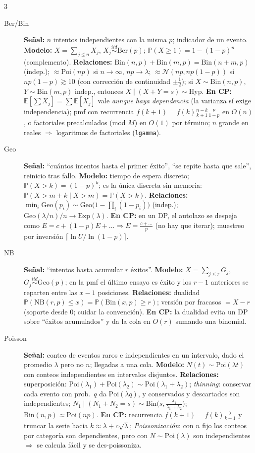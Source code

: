 \documentclass[8pt, spanish, mexico, letterpaper]{extarticle}
\newcommand{\E}{\mathbb{E}}
\newcommand{\Prob}{\mathbb{P}}
\newcommand{\<}{<}
\begin{document}
\begin{multicols*}{3}
\begin{description}
\item[Ber/Bin] \textbf{Señal:} $n$ intentos independientes con la misma $p$; indicador de un evento. \textbf{Modelo:} $X=\sum_{j\le n}X_j$, $X_j\overset{iid}\sim\mathrm{Ber}(p)$; $\Prob(X\ge1)=1-(1-p)^n$ (complemento). \textbf{Relaciones:} $\mathrm{Bin}(n,p)+\mathrm{Bin}(m,p)=\mathrm{Bin}(n + m,p)$ (indep.); $\approx\mathrm{Poi}(np)$ si $n\to\infty$, $np\to\lambda$; $\approx\mathcal N(np,np(1 - p))$ si $np(1 - p)\gtrsim10$ (con corrección de continuidad $\pm\frac12$); si $X\sim\mathrm{Bin}(n,p)$, $Y\sim\mathrm{Bin}(m,p)$ indep., entonces $X\mid(X + Y{=}s)\sim\mathrm{Hyp}$. \textbf{En CP:} $\E[\sum X_j]=\sum\E[X_j]$ vale \emph{aunque haya dependencia} (la varianza sí exige independencia); pmf con recurrencia $f(k + 1)=f(k)\frac{n-k}{k+1}\frac p{1-p}$ en $O(n)$, o factoriales precalculados (mod $M$) en $O(1)$ por término; $n$ grande en reales $\Rightarrow$ logaritmos de factoriales (\texttt{lgamma}).

\item[Geo] \textbf{Señal:} ``cuántos intentos hasta el primer éxito'', ``se repite hasta que sale'', reinicio tras fallo. \textbf{Modelo:} tiempo de espera discreto; $\Prob(X > k)=(1 - p)^k$; es la única discreta sin memoria: $\Prob(X > m + k\mid X>m)=\Prob(X > k)$. \textbf{Relaciones:} $\min_i\mathrm{Geo}(p_i)\sim\mathrm{Geo}\bigl(1-\prod_i(1 - p_i)\bigr)$ (indep.); $\mathrm{Geo}(\lambda/n)/n\to\mathrm{Exp}(\lambda)$. \textbf{En CP:} en un DP, el autolazo se despeja como $E=c+(1 - p)E+\dots\Rightarrow E=\frac{c+\dots}{p}$ (no hay que iterar); muestreo por inversión $\lceil\ln U/\ln(1 - p)\rceil$.

\item[NB] \textbf{Señal:} ``intentos hasta acumular $r$ éxitos''. \textbf{Modelo:} $X=\sum_{j\le r}G_j$, $G_j\overset{iid}\sim\mathrm{Geo}(p)$; en la pmf el último ensayo es éxito y los $r - 1$ anteriores se reparten entre las $x - 1$ posiciones. \textbf{Relaciones:} dualidad $\Prob(\mathrm{NB}(r,p)\le x)=\Prob(\mathrm{Bin}(x,p)\ge r)$; versión por fracasos $=X-r$ (soporte desde 0; cuidar la convención). \textbf{En CP:} la dualidad evita un DP sobre ``éxitos acumulados'' y da la cola en $O(r)$ sumando una binomial.

\item[Poisson] \textbf{Señal:} conteo de eventos raros e independientes en un intervalo, dado el promedio $\lambda$ pero no $n$; llegadas a una cola. \textbf{Modelo:} $N(t)\sim\mathrm{Poi}(\lambda t)$ con conteos independientes en intervalos disjuntos. \textbf{Relaciones:} superposición: $\mathrm{Poi}(\lambda_1) + \mathrm{Poi}(\lambda_2)\sim\mathrm{Poi}(\lambda_1 + \lambda_2)$; \emph{thinning}: conservar cada evento con prob.\ $q$ da $\mathrm{Poi}(\lambda q)$, y conservados y descartados son independientes; $N_1\mid(N_1 + N_2{=}s)\sim\mathrm{Bin}\bigl(s,\frac{\lambda_1}{\lambda_1+\lambda_2}\bigr)$; $\mathrm{Bin}(n,p)\approx\mathrm{Poi}(np)$. \textbf{En CP:} recurrencia $f(k + 1)=f(k)\frac\lambda{k+1}$ y truncar la serie hacia $k\approx\lambda+c\sqrt\lambda$; \emph{Poissonización}: con $n$ fijo los conteos por categoría son dependientes, pero con $N\sim\mathrm{Poi}(\lambda)$ son independientes $\Rightarrow$ se calcula fácil y se des-poissoniza.


\end{description}
\end{multicols*}
\end{document}
